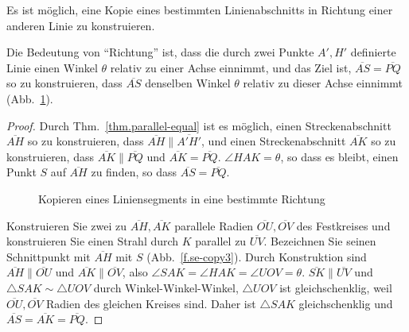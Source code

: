 \begin{theorem}\label{thm.straight-direction}
Es ist möglich, eine Kopie eines bestimmten Linienabschnitts in Richtung einer anderen Linie zu konstruieren.
\end{theorem}

Die Bedeutung von ``Richtung'' ist, dass die durch zwei Punkte $A',H'$ definierte Linie einen Winkel $\theta$ relativ zu einer Achse einnimmt, und das Ziel ist, $\overline{AS}=\overline{PQ}$ so zu konstruieren, dass $\overline{AS}$ denselben Winkel $\theta$ relativ zu dieser Achse einnimmt (Abb.~\ref{f.se-copy1}).

\begin{proof}
Durch Thm.~\ref{thm.parallel-equal} ist es möglich, einen Streckenabschnitt $\overline{AH}$ so zu konstruieren, dass $\overline{AH}\parallel\overline{A'H'}$, und einen Streckenabschnitt $\overline{AK}$ so zu konstruieren, dass $\overline{AK}\parallel\overline{PQ}$ und $\overline{AK}=\overline{PQ}$.
$\angle HAK=\theta$, so dass es bleibt, einen Punkt $S$ auf $\overline{AH}$ zu finden, so dass $\overline{AS}=\overline{PQ}$.

\begin{figure}[t]
\begin{center}
\end{center}
\caption{Kopieren eines Liniensegments in eine bestimmte Richtung}\label{f.se-copy1}
\end{figure}

Konstruieren Sie zwei zu $\overline{AH}, \overline{AK}$ parallele Radien $\overline{OU}, \overline{OV}$ des Festkreises und konstruieren Sie einen Strahl durch $K$ parallel zu $\overline{UV}$. Bezeichnen Sie seinen Schnittpunkt mit $\overline{AH}$ mit $S$ (Abb.~\ref{f.se-copy3}). Durch Konstruktion sind $\overline{AH}\parallel\overline{OU}$ und $\overline{AK}\parallel\overline{OV}$, also $\angle SAK=\angle HAK=\angle UOV=\theta$. $\overline{SK}\parallel\overline{UV}$ und $\triangle SAK\sim\triangle UOV$ durch Winkel-Winkel-Winkel, $\triangle UOV$ ist gleichschenklig, weil $\overline{OU}, \overline{OV}$ Radien des gleichen Kreises sind. Daher ist $\triangle SAK$ gleichschenklig und $\overline{AS}=\overline{AK}=\overline{PQ}$.
\end{proof}

